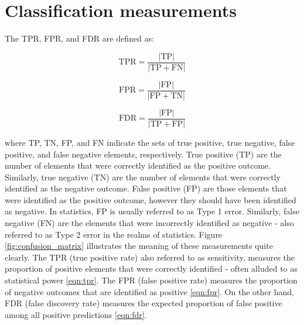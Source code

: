 \section{Classification measurements}
The TPR, FPR, and FDR are defined as:

\begin{equation}
\text{TPR}=\frac{|\text{TP}|}{|\text{TP}+\text{FN}|}
\label{eqn:tpr}
\end{equation}

\begin{equation}
\text{FPR}=\frac{|\text{FP}|}{|\text{FP}+\text{TN}|}
\label{eqn:fpr}
\end{equation}

\begin{equation}
\text{FDR}=\frac{|\text{FP}|}{|\text{TP}+\text{FP}|}
\label{eqn:fdr}
\end{equation}

where TP, TN, FP, and FN indicate the sets of true positive, true negative, false positive, and false negative elements, respectively. True positive (TP) are the number of elements that were correctly identified as the positive outcome. Similarly, true negative (TN) are the number of elements that were correctly identified as the negative outcome. False positive (FP) are those elements that were identified as the positive outcome, however they should have been identified as negative. In statistics, FP is usually referred to as Type 1 error. Similarly, false negative (FN) are the elements that were incorrectly identified as negative - also referred to as Type 2 error in the realms of statistics. Figure \ref{fig:confusion_matrix} illustrates the meaning of these measurements quite clearly. The TPR (true positive rate) also referred to as sensitivity, measures the proportion of positive elements that were correctly identified - often alluded to as statistical power \ref{eqn:tpr}. The FPR (false positive rate) measures the proportion of negative outcomes that are identified as positive \ref{eqn:fpr}. On the other hand, FDR (false discovery rate) measures the expected proportion of false positive among all positive predictions \ref{eqn:fdr}. 

